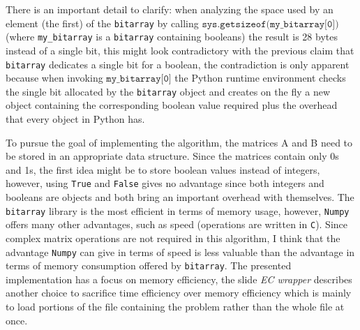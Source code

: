 \documentclass{beamer}
\begin{document}
\begin{frame}
    There is an important detail to clarify:
    when analyzing the space used by an element (the first) of the 
    \texttt{bitarray} by calling $\texttt{sys.getsizeof(my\_bitarray[0])}$ (where
    \texttt{my\_bitarray} is a \texttt{bitarray} containing booleans) the result is 28 bytes instead of a single bit, 
    this might look contradictory with the previous claim that \texttt{bitarray} dedicates a single
    bit for a boolean, the contradiction is only apparent because when invoking $\texttt{my\_bitarray[0]}$ 
    the Python runtime environment checks the single bit allocated by the \texttt{bitarray} object and
    creates on the fly a new object containing the corresponding boolean value required plus the overhead
    that every object in Python has.
\end{frame}

\begin{frame}{}
    To pursue the goal of implementing the algorithm, the matrices A and B need
    to be stored in an appropriate data structure. Since the matrices contain
    only 0s and 1s, the first idea might be to store boolean values instead
    of integers, however, using 
    \texttt{True} and \texttt{False} gives no advantage since both integers and
    booleans are objects and both bring an important overhead with themselves.
    The \texttt{bitarray} library is the most efficient in  terms of memory usage,
    however, \texttt{Numpy} offers many other advantages, such as speed (operations
    are written in \texttt{C}).
    Since complex matrix operations are not required in this algorithm, I think
    that the advantage \texttt{Numpy} can give in terms of speed is less valuable
    than the advantage in terms of memory consumption offered by \texttt{bitarray}.
    The presented implementation has a focus on memory efficiency, the slide \textit{EC wrapper} describes
    another choice to sacrifice time efficiency over memory efficiency which is mainly to
    load portions of the file containing the problem rather than the whole file at once.
\end{frame}
\end{document}
